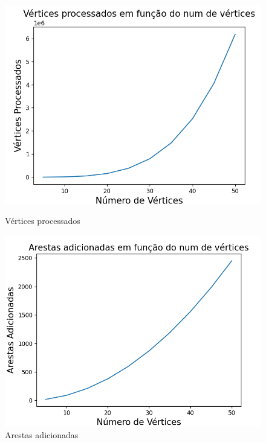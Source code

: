 \documentclass[code,math]{relatorio-deti}
\begin{document}
\begin{figure}[h] 
    \centering 
    \begin{minipage}{0.45\textwidth} 
        \centering 
        \includegraphics[width=\linewidth]{vertices.png} \caption{Vértices processados} 
        \label{fig:vertices}
    \end{minipage}\hfill 
    \begin{minipage}{0.45\textwidth} 
        \centering \includegraphics[width=\linewidth]{arestas.png}
        \caption{Arestas adicionadas} 
        \label{fig:arestas} 
    \end{minipage}      
\end{figure}


\end{document}
